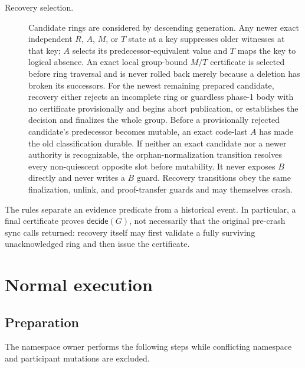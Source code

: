 \documentclass[10pt,twocolumn]{article}
\theoremstyle{remark}
\begin{document}
\begin{description}
  \item[Recovery selection.] Candidate rings are considered by descending generation. Any newer
  exact independent $R$, $A$, $M$, or $T$ state at a key suppresses older witnesses at that key;
  $A$ selects its predecessor-equivalent value and $T$ maps the key to logical absence. An exact
  local group-bound $M/T$ certificate is selected before ring
  traversal and is never rolled back merely because a deletion has broken its successors. For the
  newest remaining prepared candidate, recovery either rejects an incomplete ring or guardless
  phase-1 body with no certificate provisionally and begins abort publication, or establishes the
  decision and finalizes the whole group. Before a provisionally rejected candidate's
  predecessor becomes mutable, an exact code-last $A$ has made the old classification durable. If neither an exact
  candidate nor a newer authority is recognizable, the orphan-normalization transition resolves
  every non-quiescent opposite slot before mutability. It never exposes $B$ directly and never
  writes a $B$ guard. Recovery transitions obey
  the same finalization, unlink, and proof-transfer guards and may themselves crash.
\end{description}

The rules separate an evidence predicate from a historical event. In particular, a final
certificate proves $\mathsf{decide}(G)$, not necessarily that the original pre-crash sync calls
returned: recovery itself may first validate a fully surviving unacknowledged ring and then issue
the certificate.

\section{Normal execution}

\subsection{Preparation}

The namespace owner performs the following steps while conflicting namespace and participant
mutations are excluded.
\end{document}

